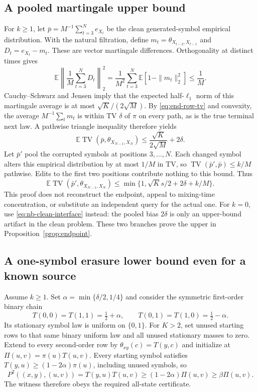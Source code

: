 \subsection{A pooled martingale upper bound}
For $k\geq1$, let
$\bar p=M^{-1}\sum_{t=3}^N e_{X_t}$ be the clean generated-symbol
empirical distribution.  With the natural filtration, define
$m_t=\theta_{X_{t-2},X_{t-1}}$ and $D_t=e_{X_t}-m_t$.
These are vector martingale differences.  Orthogonality at distinct
times gives
\[
 \mathbb E\left\|\frac1M\sum_{t=3}^ND_t\right\|_2^2
 =\frac1{M^2}\sum_{t=3}^N\mathbb E[1-\|m_t\|_2^2]
 \leq\frac1M.
\]
Cauchy--Schwarz and Jensen imply that the expected half-$\ell_1$ norm
of this martingale average is at most $\sqrt K/(2\sqrt M)$.
By \eqref{eq:end-row-tv} and convexity, the average $M^{-1}\sum_tm_t$
is within TV $\delta$ of $\pi$ on every path, as is the true terminal
next law.  A pathwise triangle inequality therefore yields
\[
 \mathbb E\operatorname{TV}(\bar p,\theta_{X_{N-1},X_N})
 \leq\frac{\sqrt K}{2\sqrt M}+2\delta.
\]
Let $\bar p'$ pool the corrupted symbols at positions $3,\ldots,N$.
Each changed symbol alters this empirical distribution by at most
$1/M$ in TV, so $\operatorname{TV}(\bar p',\bar p)\leq k/M$ pathwise.
Edits to the first two positions contribute nothing to this bound.
Thus
\begin{equation}\label{eq:end-upper}
 \mathbb E\operatorname{TV}(\bar p',\theta_{X_{N-1},X_N})
 \leq\min\{1,\sqrt K s/2+2\delta+k/M\}.
\end{equation}
This proof does not reconstruct the endpoint, appeal to mixing-time
concentration, or substitute an independent query for the actual one.
For $k=0$, use \eqref{eq:nb-clean-interface} instead: the pooled bias
$2\delta$ is only an upper-bound artifact in the clean problem.
These two branches prove the upper in Proposition~\ref{prop:endpoint}.

\subsection{A one-symbol erasure lower bound even for a known source}
Assume $k\geq1$.  Set $\alpha=\min\{\delta/2,1/4\}$ and consider the
symmetric first-order binary chain
\[
 T(0,0)=T(1,1)=\tfrac12+\alpha,
 \qquad T(0,1)=T(1,0)=\tfrac12-\alpha.
\]
Its stationary symbol law is uniform on $\{0,1\}$.  For $K>2$, set
unused starting rows to that same binary uniform law and all unused
stationary masses to zero.  Extend to every second-order row by
$\theta_{xy}(c)=T(y,c)$ and initialize at
$\Pi(u,v)=\pi(u)T(u,v)$.  Every starting symbol satisfies
$T(y,u)\geq(1-2\alpha)\pi(u)$, including unused symbols, so
\[
 P^2((x,y),(u,v))=T(y,u)T(u,v)
 \geq(1-2\alpha)\Pi(u,v)\geq\beta\Pi(u,v).
\]
The witness therefore obeys the required all-state certificate.

